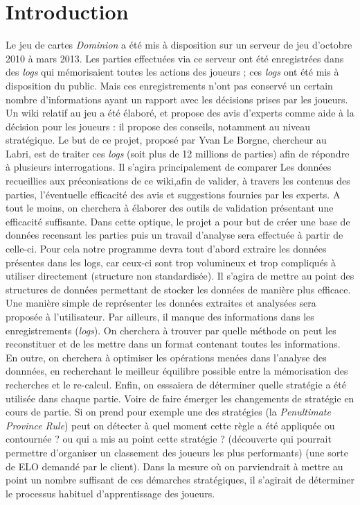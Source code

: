 \documentclass{scrreprt}
\begin{document}
\section{Introduction}
Le jeu de cartes \textit{Dominion} a été mis à disposition sur un serveur de jeu d'octobre 2010 à mars 2013. Les parties effectuées via ce serveur ont été enregistrées dans des \textit{logs} qui mémorisaient toutes les actions des joueurs ; ces \textit{logs} ont été mis à disposition du public. Mais ces enregistrements n'ont pas conservé un certain nombre d'informations ayant un rapport avec les décisions prises par les joueurs.
\newline Un wiki relatif au jeu a été élaboré, et propose des avis d'experts comme aide à la décision pour les joueurs : il propose des conseils, notamment au niveau stratégique. Le but de ce projet, proposé par Yvan Le Borgne, chercheur au Labri, est de traiter ces \textit{logs} (soit plus de 12 millions de parties) afin de répondre à plusieurs interrogations. Il s'agira principalement de comparer Les données recueillies aux préconisations de ce wiki,afin de valider, à travers les contenus des parties, l'éventuelle efficacité des avis et suggestions fournies par les experts. A tout le moins, on cherchera à élaborer des outils de validation présentant une efficacité suffisante.
\newline Dans cette optique, le projet a pour but de créer une base de données recensant les parties puis un travail d'analyse sera effectuée à partir de celle-ci.
Pour cela notre programme devra tout d'abord extraire les données présentes dans les logs, car ceux-ci sont trop volumineux et trop compliqués à utiliser directement (structure non standardisée). Il s'agira de mettre au point des structures de données permettant de stocker les données de manière plus efficace. Une manière simple de représenter les données extraites et analysées sera proposée à l'utilisateur.
Par ailleurs, il manque des informations dans les enregistrements (\textit{logs}). On cherchera à trouver par quelle méthode on peut les reconstituer et de les mettre dans un format contenant toutes les informations.
En outre, on cherchera à optimiser les opérations menées dans l'analyse des donnnées, en recherchant le meilleur équilibre possible entre la mémorisation des recherches et le re-calcul.
Enfin, on esssaiera de déterminer quelle stratégie a été utilisée dans chaque partie. Voire de faire émerger les changements de stratégie en cours de partie. Si on prend pour exemple une des stratégies (la \textit{Penultimate Province Rule}) peut on détecter à quel moment cette règle a été appliquée ou contournée ? ou qui a mis au point cette stratégie ? (découverte qui pourrait permettre d'organiser un classement des joueurs les plus performants) (une sorte de ELO demandé par le client). Dans la mesure où on parviendrait à mettre au point un nombre suffisant de ces démarches stratégiques, il s'agirait de déterminer le processus habituel d'apprentissage des joueurs.
\end{document}
